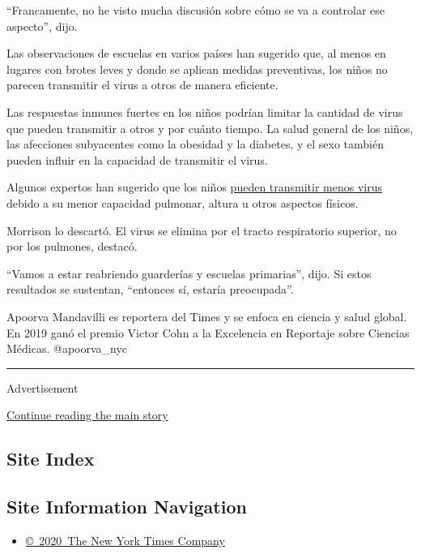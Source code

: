 ``Francamente, no he visto mucha discusión sobre cómo se va a controlar
ese aspecto'', dijo.

Las observaciones de escuelas en varios países han sugerido que, al
menos en lugares con brotes leves y donde se aplican medidas
preventivas, los niños no parecen transmitir el virus a otros de manera
eficiente.

Las respuestas inmunes fuertes en los niños podrían limitar la cantidad
de virus que pueden transmitir a otros y por cuánto tiempo. La salud
general de los niños, las afecciones subyacentes como la obesidad y la
diabetes, y el sexo también pueden influir en la capacidad de transmitir
el virus.

Algunos expertos han sugerido que los niños
\href{https://www.nytimes3xbfgragh.onion/2020/06/30/us/coronavirus-schools-reopening-guidelines-aap.html}{pueden
transmitir menos virus} debido a su menor capacidad pulmonar, altura u
otros aspectos físicos.

Morrison lo descartó. El virus se elimina por el tracto respiratorio
superior, no por los pulmones, destacó.

``Vamos a estar reabriendo guarderías y escuelas primarias'', dijo. Si
estos resultados se sustentan, ``entonces sí, estaría preocupada''.

Apoorva Mandavilli es reportera del Times y se enfoca en ciencia y salud
global. En 2019 ganó el premio Victor Cohn a la Excelencia en Reportaje
sobre Ciencias Médicas. @apoorva\_nyc

\begin{center}\rule{0.5\linewidth}{\linethickness}\end{center}

Advertisement

\protect\hyperlink{after-bottom}{Continue reading the main story}

\hypertarget{site-index}{%
\subsection{Site Index}\label{site-index}}

\hypertarget{site-information-navigation}{%
\subsection{Site Information
Navigation}\label{site-information-navigation}}

\begin{itemize}
\tightlist
\item
  \href{https://help.nytimes3xbfgragh.onion/hc/en-us/articles/115014792127-Copyright-notice}{©~2020~The
  New York Times Company}
\end{itemize}

